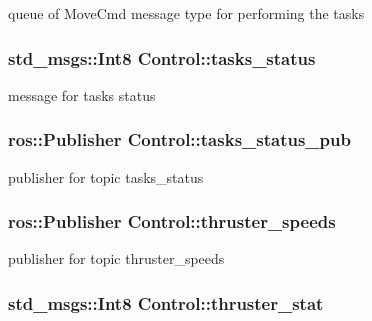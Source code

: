 queue of Move\+Cmd message type for performing the tasks 

\subsubsection[{\texorpdfstring{tasks\+\_\+status}{tasks_status}}]{\setlength{\rightskip}{0pt plus 5cm}std\+\_\+msgs\+::\+Int8 Control\+::tasks\+\_\+status\hspace{0.3cm}{\ttfamily [private]}}\hypertarget{classControl_a33f504fc4fc4d72aece54ac1d54e0dce}{}\label{classControl_a33f504fc4fc4d72aece54ac1d54e0dce}


message for tasks status 

\subsubsection[{\texorpdfstring{tasks\+\_\+status\+\_\+pub}{tasks_status_pub}}]{\setlength{\rightskip}{0pt plus 5cm}ros\+::\+Publisher Control\+::tasks\+\_\+status\+\_\+pub\hspace{0.3cm}{\ttfamily [private]}}\hypertarget{classControl_a3b6b1a9000c0a6eb5037b43fac65f79a}{}\label{classControl_a3b6b1a9000c0a6eb5037b43fac65f79a}


publisher for topic tasks\+\_\+status 

\subsubsection[{\texorpdfstring{thruster\+\_\+speeds}{thruster_speeds}}]{\setlength{\rightskip}{0pt plus 5cm}ros\+::\+Publisher Control\+::thruster\+\_\+speeds\hspace{0.3cm}{\ttfamily [private]}}\hypertarget{classControl_a723ac5a2c2928cebde4b372f9feb4b0f}{}\label{classControl_a723ac5a2c2928cebde4b372f9feb4b0f}


publisher for topic thruster\+\_\+speeds 

\subsubsection[{\texorpdfstring{thruster\+\_\+stat}{thruster_stat}}]{\setlength{\rightskip}{0pt plus 5cm}std\+\_\+msgs\+::\+Int8 Control\+::thruster\+\_\+stat\hspace{0.3cm}{\ttfamily [private]}}\hypertarget{classControl_a357ebd67bec91c792a7d904624a21ac6}{}\label{classControl_a357ebd67bec91c792a7d904624a21ac6}


